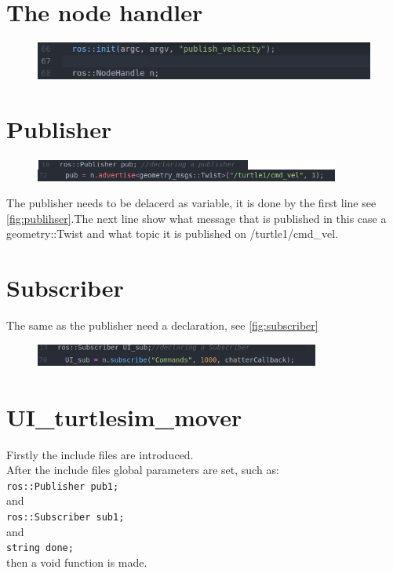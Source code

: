 \section{The node handler}

\begin{figure}[h]
\includegraphics[width=.9\textwidth]{figures/nodehandel.png}
\end{figure}\label{fig:nodehandel}


\section{Publisher}
\begin{figure}[h]
\includegraphics[width=.9\textwidth]{figures/publisher.png}
\end{figure}\label{fig:publihser}
The publisher needs to be delacerd as variable, it is done by the first line see \ref{fig:publihser}.The next line show what message that is published in this case a geometry::Twist and what topic it is published on /turtle1/cmd\_vel.


\section{Subscriber}
The same as the publisher need a declaration, see \ref{fig:subscriber} 

\begin{figure}[h]
\begin{center}
\includegraphics[width=.9\textwidth]{figures/subscriber.png}
\end{center}
\end{figure}\label{fig:subscriber}

\section{UI\_turtlesim\_mover}

Firstly the include files are introduced.\\
After the include files global parameters are set, such as:\\
\texttt{ros::Publisher pub1;}\\
and\\
\texttt{ros::Subscriber sub1;}\\
and\\
\texttt{string done;}\\
then a void function is made.\\

